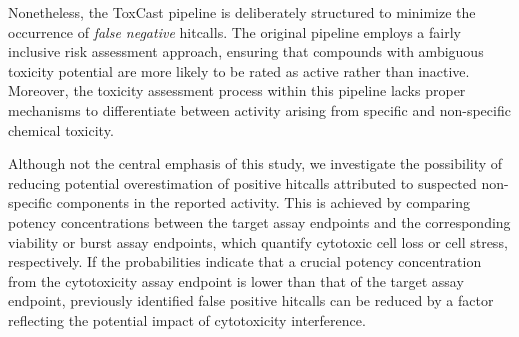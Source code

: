 Nonetheless, the ToxCast pipeline is deliberately structured to minimize the occurrence of \emph{false negative} hitcalls. The original pipeline employs a fairly inclusive risk assessment approach, ensuring that compounds with ambiguous toxicity potential are more likely to be rated as active rather than inactive. Moreover, the toxicity assessment process within this pipeline lacks proper mechanisms to differentiate between activity arising from specific and non-specific chemical toxicity.

Although not the central emphasis of this study, we investigate the possibility of reducing potential overestimation of positive hitcalls attributed to suspected non-specific components in the reported activity. This is achieved by comparing potency concentrations between the target assay endpoints and the corresponding viability or burst assay endpoints, which quantify cytotoxic cell loss or cell stress, respectively. If the probabilities indicate that a crucial potency concentration from the cytotoxicity assay endpoint is lower than that of the target assay endpoint, previously identified false positive hitcalls can be reduced by a factor reflecting the potential impact of cytotoxicity interference.






